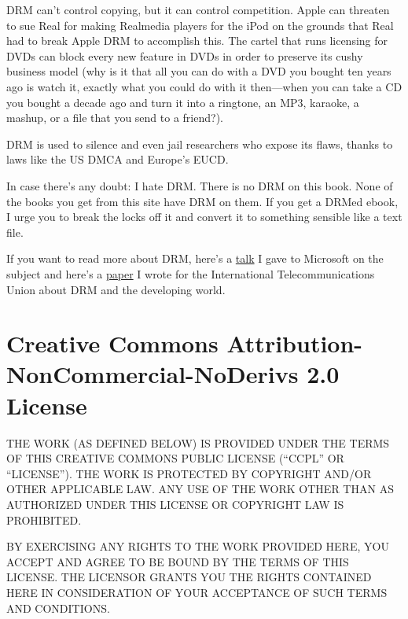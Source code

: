 \documentclass{article}
\begin{document}
DRM can't control copying, but it can control competition.  Apple can
threaten to sue Real for making Realmedia players for the iPod on the
grounds that Real had to break Apple DRM to accomplish this.  The
cartel that runs licensing for DVDs can block every new feature in
DVDs in order to preserve its cushy business model (why is it that all
you can do with a DVD you bought ten years ago is watch it, exactly
what you could do with it then---when you can take a CD you bought a
decade ago and turn it into a ringtone, an MP3, karaoke, a mashup, or
a file that you send to a friend?).

DRM is used to silence and even jail researchers who expose its flaws,
thanks to laws like the US DMCA and Europe's EUCD. 

In case there's any doubt:  I hate DRM.  There is no DRM on this book. 
None of the books you get from this site have DRM on them.  If you get
a DRMed ebook, I urge you to break the locks off it and convert it to
something sensible like a text file. 

If you want to read more about DRM, here's a
\href{http://craphound.com/msftdrm.txt}{talk} I gave to Microsoft
on the subject and here's a 
\href{http://www.eff.org/IP/DRM/itu_drm.php}{paper} I wrote for the
International Telecommunications Union about DRM and the developing
world.



\section{Creative Commons Attribution-NonCommercial-NoDerivs 2.0
License}

THE WORK (AS DEFINED BELOW) IS PROVIDED UNDER THE TERMS OF THIS
CREATIVE COMMONS PUBLIC LICENSE (``CCPL'' OR ``LICENSE'').  THE WORK
IS PROTECTED BY COPYRIGHT AND/OR OTHER APPLICABLE LAW.  ANY USE OF THE
WORK OTHER THAN AS AUTHORIZED UNDER THIS LICENSE OR COPYRIGHT LAW IS
PROHIBITED.

BY EXERCISING ANY RIGHTS TO THE WORK PROVIDED HERE, YOU ACCEPT AND
AGREE TO BE BOUND BY THE TERMS OF THIS LICENSE.  THE LICENSOR GRANTS
YOU THE RIGHTS CONTAINED HERE IN CONSIDERATION OF YOUR ACCEPTANCE OF
SUCH TERMS AND CONDITIONS.
\end{document}
